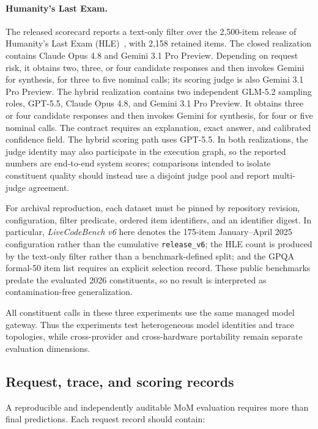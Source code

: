 \paragraph{Humanity's Last Exam.}
The released scorecard reports a text-only filter over the 2,500-item release
of Humanity's Last Exam (HLE)~\citep{phan_2026_hle}, with 2,158 retained items.
The closed realization contains Claude Opus 4.8 and Gemini 3.1
Pro Preview. Depending on request risk, it obtains two, three, or four candidate
responses and then invokes Gemini for synthesis, for three to five nominal
calls; its scoring judge is also Gemini 3.1 Pro Preview. The hybrid realization
contains two independent GLM-5.2 sampling roles, GPT-5.5, Claude Opus 4.8, and
Gemini 3.1 Pro Preview. It obtains three or four candidate responses and then
invokes Gemini for synthesis, for four or five nominal calls.
The contract requires an explanation, exact answer, and calibrated confidence
field. The hybrid scoring path uses GPT-5.5. In both realizations, the judge
identity may also participate in the execution graph, so the reported numbers
are end-to-end system scores; comparisons intended to isolate constituent
quality should instead use a disjoint judge pool and report multi-judge
agreement.

For archival reproduction, each dataset must be pinned by repository revision,
configuration, filter predicate, ordered item identifiers, and an identifier
digest. In particular, \emph{LiveCodeBench v6} here denotes the 175-item
January--April 2025 configuration rather than the cumulative
\texttt{release\_v6}; the HLE count is produced by the text-only filter rather
than a benchmark-defined split; and the GPQA formal-50 item list requires an
explicit selection record. These public benchmarks predate the evaluated 2026
constituents, so no result is interpreted as contamination-free
generalization.

All constituent calls in these three experiments use the same managed model
gateway.  Thus the experiments test heterogeneous model identities and trace
topologies, while cross-provider and cross-hardware portability remain separate
evaluation dimensions.

\subsection{Request, trace, and scoring records}

A reproducible and independently auditable MoM evaluation requires more than
final predictions. Each
request record should contain:

